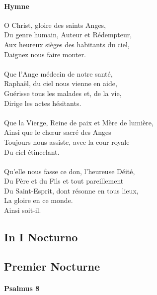 \documentclass[twoside]{article}
\begin{document}
\begin{paracol}[1]{2}

\switchcolumn

\paragraph{Hymne}

O Christ, gloire des saints Anges,\\
Du genre humain, Auteur et Rédempteur,\\
Aux heureux sièges des habitants du ciel,\\
Daignez nous faire monter.\\
~\\
Que l’Ange médecin de notre santé,\\
Raphaël, du ciel nous vienne en aide,\\
Guérisse tous les malades et, de la vie,\\
Dirige les actes hésitants.\\
~\\
Que la Vierge, Reine de paix et Mère de lumière,\\
Ainsi que le chœur sacré des Anges\\
Toujours nous assiste, avec la cour royale\\
Du ciel étincelant.\\
~\\
Qu’elle nous fasse ce don, l’heureuse Déité,\\
Du Père et du Fils et tout pareillement\\
Du Saint-Esprit, dont résonne en tous lieux,\\
La gloire en ce monde.\\
Ainsi soit-il.

\switchcolumn*

\subsection{In I Nocturno}

\switchcolumn

\subsection{Premier Nocturne}

\switchcolumn*

\paragraph{Psalmus 8}


\end{paracol}
\end{document}
